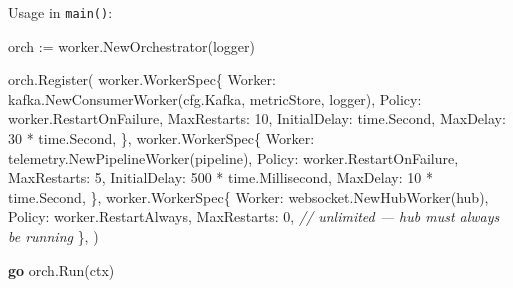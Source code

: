 \documentclass[
]{article}
\newenvironment{Shaded}{}{}
\newcommand{\CommentTok}[1]{\textcolor[rgb]{0.38,0.63,0.69}{\textit{#1}}}
\newcommand{\ControlFlowTok}[1]{\textcolor[rgb]{0.00,0.44,0.13}{\textbf{#1}}}
\newcommand{\DecValTok}[1]{\textcolor[rgb]{0.25,0.63,0.44}{#1}}
\newcommand{\NormalTok}[1]{#1}
\newcommand{\OperatorTok}[1]{\textcolor[rgb]{0.40,0.40,0.40}{#1}}
\begin{document}
Usage in \texttt{main()}:

\begin{Shaded}
\begin{Highlighting}[]
\NormalTok{orch }\OperatorTok{:=}\NormalTok{ worker}\OperatorTok{.}\NormalTok{NewOrchestrator}\OperatorTok{(}\NormalTok{logger}\OperatorTok{)}

\NormalTok{orch}\OperatorTok{.}\NormalTok{Register}\OperatorTok{(}
\NormalTok{    worker}\OperatorTok{.}\NormalTok{WorkerSpec}\OperatorTok{\{}
\NormalTok{        Worker}\OperatorTok{:}\NormalTok{ kafka}\OperatorTok{.}\NormalTok{NewConsumerWorker}\OperatorTok{(}\NormalTok{cfg}\OperatorTok{.}\NormalTok{Kafka}\OperatorTok{,}\NormalTok{ metricStore}\OperatorTok{,}\NormalTok{ logger}\OperatorTok{),}
\NormalTok{        Policy}\OperatorTok{:}\NormalTok{ worker}\OperatorTok{.}\NormalTok{RestartOnFailure}\OperatorTok{,}
\NormalTok{        MaxRestarts}\OperatorTok{:}  \DecValTok{10}\OperatorTok{,}
\NormalTok{        InitialDelay}\OperatorTok{:}\NormalTok{ time}\OperatorTok{.}\NormalTok{Second}\OperatorTok{,}
\NormalTok{        MaxDelay}\OperatorTok{:}     \DecValTok{30} \OperatorTok{*}\NormalTok{ time}\OperatorTok{.}\NormalTok{Second}\OperatorTok{,}
    \OperatorTok{\},}
\NormalTok{    worker}\OperatorTok{.}\NormalTok{WorkerSpec}\OperatorTok{\{}
\NormalTok{        Worker}\OperatorTok{:}\NormalTok{ telemetry}\OperatorTok{.}\NormalTok{NewPipelineWorker}\OperatorTok{(}\NormalTok{pipeline}\OperatorTok{),}
\NormalTok{        Policy}\OperatorTok{:}\NormalTok{ worker}\OperatorTok{.}\NormalTok{RestartOnFailure}\OperatorTok{,}
\NormalTok{        MaxRestarts}\OperatorTok{:}  \DecValTok{5}\OperatorTok{,}
\NormalTok{        InitialDelay}\OperatorTok{:} \DecValTok{500} \OperatorTok{*}\NormalTok{ time}\OperatorTok{.}\NormalTok{Millisecond}\OperatorTok{,}
\NormalTok{        MaxDelay}\OperatorTok{:}     \DecValTok{10} \OperatorTok{*}\NormalTok{ time}\OperatorTok{.}\NormalTok{Second}\OperatorTok{,}
    \OperatorTok{\},}
\NormalTok{    worker}\OperatorTok{.}\NormalTok{WorkerSpec}\OperatorTok{\{}
\NormalTok{        Worker}\OperatorTok{:}\NormalTok{ websocket}\OperatorTok{.}\NormalTok{NewHubWorker}\OperatorTok{(}\NormalTok{hub}\OperatorTok{),}
\NormalTok{        Policy}\OperatorTok{:}\NormalTok{ worker}\OperatorTok{.}\NormalTok{RestartAlways}\OperatorTok{,}
\NormalTok{        MaxRestarts}\OperatorTok{:} \DecValTok{0}\OperatorTok{,} \CommentTok{// unlimited — hub must always be running}
    \OperatorTok{\},}
\OperatorTok{)}

\ControlFlowTok{go}\NormalTok{ orch}\OperatorTok{.}\NormalTok{Run}\OperatorTok{(}\NormalTok{ctx}\OperatorTok{)}
\end{Highlighting}
\end{Shaded}
\end{document}
